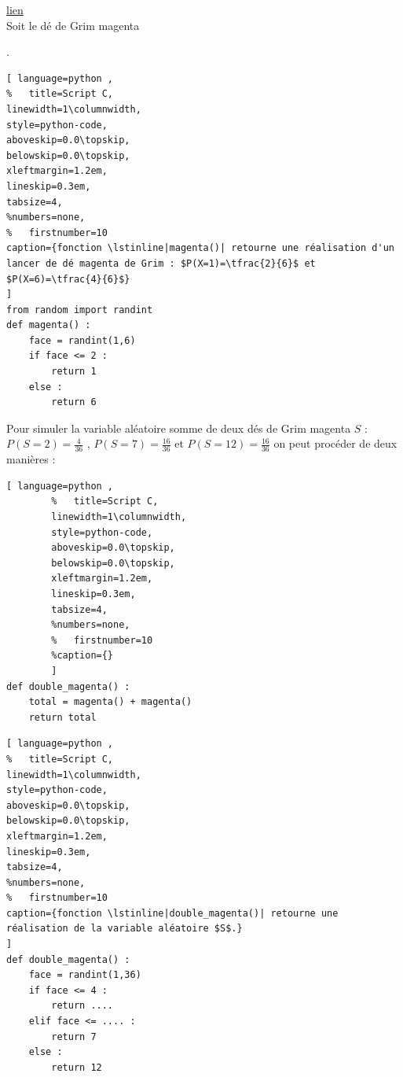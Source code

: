\documentclass[main.tex]{subfiles}
\begin{document}
\newpage 
\begin{example}  \href{https://my.numworks.com/python/niz-moussatat/de_grim_magenta}{lien}\\
Soit le dé de Grim magenta  .  

\noindent
\begin{lstlisting}[ language=python , 
%	title=Script C,   
linewidth=1\columnwidth,
style=python-code,    
aboveskip=0.0\topskip,
belowskip=0.0\topskip,
xleftmargin=1.2em,
lineskip=0.3em,
tabsize=4, 
%numbers=none,
%	firstnumber=10  
caption={fonction \lstinline|magenta()| retourne une réalisation d'un lancer de dé magenta de Grim : $P(X=1)=\tfrac{2}{6}$ et $P(X=6)=\tfrac{4}{6}$}
] 
from random import randint 
def magenta() :	
	face = randint(1,6)
	if face <= 2 :
		return 1
	else :
		return 6 
\end{lstlisting} 



\noindent
\begin{minipage}{0.6\linewidth}
\noindent Pour simuler la variable aléatoire somme de deux dés de Grim magenta $S$ : $P(S=2)=\tfrac{4}{36}$ , $P(S=7)=\tfrac{16}{36}$ et $P(S=12)=\tfrac{16}{36}$ on peut procéder de deux manières :
	\begin{lstlisting}[ language=python , 
		%	title=Script C,   
		linewidth=1\columnwidth,
		style=python-code,    
		aboveskip=0.0\topskip,
		belowskip=0.0\topskip,
		xleftmargin=1.2em,
		lineskip=0.3em,
		tabsize=4, 
		%numbers=none,
		%	firstnumber=10  
		%caption={}
		]  
def double_magenta() :	
	total = magenta() + magenta() 
	return total
\end{lstlisting} 
\end{minipage}
\hfill
\begin{minipage}{0.38\linewidth}
\begin{lstlisting}[ language=python , 
%	title=Script C,   
linewidth=1\columnwidth,
style=python-code,    
aboveskip=0.0\topskip,
belowskip=0.0\topskip,
xleftmargin=1.2em,
lineskip=0.3em,
tabsize=4, 
%numbers=none,
%	firstnumber=10  
caption={fonction \lstinline|double_magenta()| retourne une réalisation de la variable aléatoire $S$.}
]  
def double_magenta() :	
	face = randint(1,36)
	if face <= 4 :
		return ....
	elif face <= .... :
		return 7
	else :
		return 12
\end{lstlisting} 
\end{minipage}



\end{example}
\end{document}
